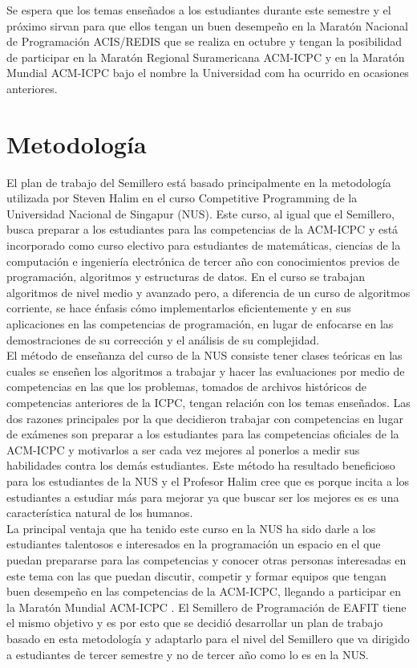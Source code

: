 \documentclass[conference]{IEEEtran}
\begin{document}
Se espera que los temas enseñados a los estudiantes durante este semestre y el próximo sirvan para que ellos tengan un buen desempeño en la Maratón Nacional de Programación ACIS/REDIS que se realiza en octubre y tengan la posibilidad de participar en la Maratón Regional Suramericana ACM-ICPC y en la Maratón Mundial ACM-ICPC bajo el nombre la Universidad com ha ocurrido en ocasiones anteriores.

\section{Metodología}
El plan de trabajo del Semillero está basado principalmente en la metodología utilizada por Steven Halim en el curso Competitive Programming de la Universidad Nacional de Singapur (NUS). Este curso, al igual que el Semillero, busca preparar a los estudiantes para las competencias de la ACM-ICPC y está incorporado como curso electivo para estudiantes de matemáticas, ciencias de la computación e ingeniería electrónica de tercer año con conocimientos previos de programación, algoritmos y estructuras de datos. En el curso se trabajan algoritmos de nivel medio y avanzado pero, a diferencia de un curso de algoritmos corriente, se hace énfasis cómo implementarlos eficientemente y en sus aplicaciones en las competencias de programación, en lugar de enfocarse en las demostraciones de su corrección y el análisis de su complejidad\cite{PaperHalim}.\\
El método de enseñanza del curso de la NUS consiste tener clases teóricas en las cuales se enseñen los algoritmos a trabajar y hacer las evaluaciones por medio de competencias en las que los problemas, tomados de archivos históricos de competencias anteriores de la ICPC, tengan relación con los temas enseñados. Las dos razones principales por la que decidieron trabajar con competencias en lugar de exámenes son preparar a los estudiantes para las competencias oficiales de la ACM-ICPC y motivarlos a ser cada vez mejores al ponerlos a medir sus habilidades contra los demás estudiantes. Este método ha resultado beneficioso para los estudiantes de la NUS y el Profesor Halim cree que es porque incita a los estudiantes a estudiar más para mejorar ya que buscar ser los mejores es es una característica natural de los humanos.\\
La principal ventaja que ha tenido este curso en la NUS ha sido darle a los estudiantes talentosos e interesados en la programación un espacio en el que puedan prepararse para las competencias y conocer otras personas interesadas en este tema con las que puedan discutir, competir y formar equipos que tengan buen desempeño en las competencias de la ACM-ICPC, llegando a participar en la Maratón Mundial ACM-ICPC \cite{AlgoNUS}. El Semillero de Programación de EAFIT tiene el mismo objetivo y es por esto que se decidió desarrollar un plan de trabajo basado en esta metodología y adaptarlo para el nivel del Semillero que va dirigido a estudiantes de tercer semestre y no de tercer año como lo es en la NUS.
\end{document}
